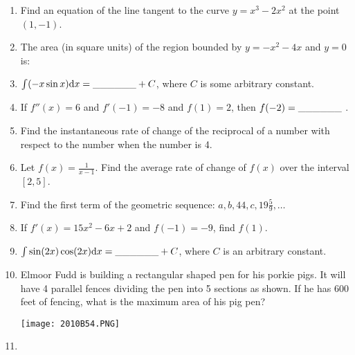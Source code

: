 \documentclass[../uilmath.tex]{subfiles}
\begin{document}
\begin{enumerate}[label=\bfseries\arabic*.]
    \item %
    Find an equation of the line tangent to the curve $y=x^3-2x^2$ at the point $(1,-1)$.

    \item %
    The area (in square units) of the region bounded by $y=-x^2-4x$ and $y=0$ is: 

    \item %
    $\int (-x\sin x)\mathrm{d} x=\_\_\_\_\_\_ +C$, where $C$ is some arbitrary constant.

    \item %
    If $f''(x)=6$ and $f'(-1)=-8$ and $f(1)=2$, then $f(-2)=\_\_\_\_\_\_$ .

    \item %
    Find the instantaneous rate of change of the reciprocal of a number with respect to the number when the number is 4.

    \item %
    Let $f(x)=\frac{1}{x-1}$. Find the average rate of change of $f(x)$ over the interval $[2,5]$.

    \item %
    Find the first term of the geometric sequence: $a,b,44,c,19\frac{5}{9},\dots$

    \item %
    If $f'(x)=15x^2-6x+2$ and $f(-1)=-9$, find $f(1)$.

    \item %
    $\int \sin(2x)\cos(2x)\mathrm{d} x=\_\_\_\_\_\_ +C$, where $C$ is an arbitrary constant.

    \item %
    Elmoor Fudd is building a rectangular shaped pen for his porkie pigs. It will have 4 parallel fences dividing the pen into 5 sections as shown. If he has 600 feet of fencing, what is the maximum area of his pig pen?
    \begin{center}
        \texttt{[image: 2010B54.PNG]}
    \end{center}

    \item %
    
    
\end{enumerate}
\end{document}
